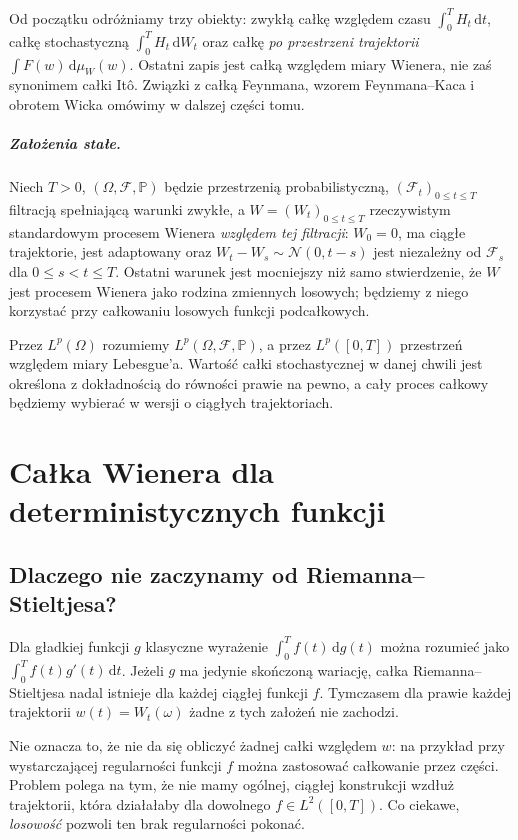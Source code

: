 \documentclass[11pt,a4paper,oneside]{report}
\numberwithin{equation}{chapter}
\theoremstyle{plain}
\theoremstyle{definition}
\theoremstyle{remark}
\newcommand{\Prob}{\mathbb{P}}
\newcommand{\calF}{\mathcal{F}}
\newcommand{\dd}{\mathrm{d}}
\newcommand{\Normal}{\mathcal{N}}
\begin{document}
Od początku odróżniamy trzy obiekty: zwykłą całkę względem czasu
$\int_0^T H_t\,\dd t$, całkę stochastyczną
$\int_0^T H_t\,\dd W_t$ oraz całkę \emph{po przestrzeni trajektorii}
$\int F(w)\,\dd\mu_W(w)$. Ostatni zapis jest całką względem miary
Wienera, nie zaś synonimem całki Itô. Związki z całką Feynmana,
wzorem Feynmana--Kaca i obrotem Wicka omówimy w dalszej części tomu.

\paragraph{Założenia stałe.}
Niech $T>0$, $(\Omega,\calF,\Prob)$ będzie przestrzenią probabilistyczną,
$(\calF_t)_{0\le t\le T}$ filtracją spełniającą warunki zwykłe,
a $W=(W_t)_{0\le t\le T}$ rzeczywistym standardowym procesem Wienera
\emph{względem tej filtracji}: $W_0=0$, ma ciągłe trajektorie,
jest adaptowany oraz $W_t-W_s\sim\Normal(0,t-s)$ jest niezależny
od $\calF_s$ dla $0\le s<t\le T$. Ostatni warunek jest mocniejszy
niż samo stwierdzenie, że $W$ jest procesem Wienera jako rodzina
zmiennych losowych; będziemy z niego korzystać przy całkowaniu
losowych funkcji podcałkowych.

Przez $L^p(\Omega)$ rozumiemy $L^p(\Omega,\calF,\Prob)$,
a przez $L^p([0,T])$ przestrzeń względem miary Lebesgue'a.
Wartość całki stochastycznej w danej chwili jest określona z dokładnością
do równości prawie na pewno, a cały proces całkowy będziemy wybierać
w wersji o ciągłych trajektoriach.

\chapter{Całka Wienera dla deterministycznych funkcji}
\label{ch:wiener-integral}
\section{Dlaczego nie zaczynamy od Riemanna--Stieltjesa?}
Dla gładkiej funkcji $g$ klasyczne wyrażenie
$\int_0^T f(t)\,\dd g(t)$ można rozumieć jako
$\int_0^T f(t)g'(t)\,\dd t$. Jeżeli $g$ ma jedynie
skończoną wariację, całka Riemanna--Stieltjesa nadal istnieje
dla każdej ciągłej funkcji $f$. Tymczasem dla prawie każdej
trajektorii $w(t)=W_t(\omega)$ żadne z tych założeń nie zachodzi.

Nie oznacza to, że nie da się obliczyć żadnej całki względem $w$:
na przykład przy wystarczającej regularności funkcji $f$ można
zastosować całkowanie przez części. Problem polega na tym,
że nie mamy ogólnej, ciągłej konstrukcji wzdłuż trajektorii,
która działałaby dla dowolnego $f\in L^2([0,T])$.
Co ciekawe, \emph{losowość} pozwoli ten brak regularności pokonać.
\end{document}

